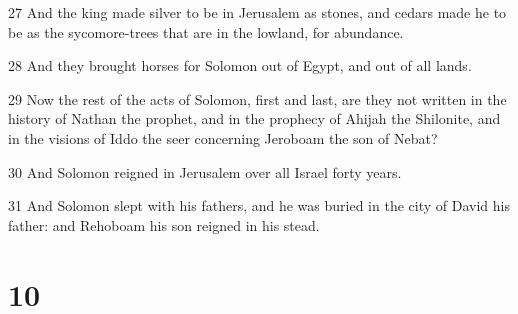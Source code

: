 \par 27 And the king made silver to be in Jerusalem as stones, and cedars made he to be as the sycomore-trees that are in the lowland, for abundance.
\par 28 And they brought horses for Solomon out of Egypt, and out of all lands.
\par 29 Now the rest of the acts of Solomon, first and last, are they not written in the history of Nathan the prophet, and in the prophecy of Ahijah the Shilonite, and in the visions of Iddo the seer concerning Jeroboam the son of Nebat?
\par 30 And Solomon reigned in Jerusalem over all Israel forty years.
\par 31 And Solomon slept with his fathers, and he was buried in the city of David his father: and Rehoboam his son reigned in his stead.

\chapter{10}

